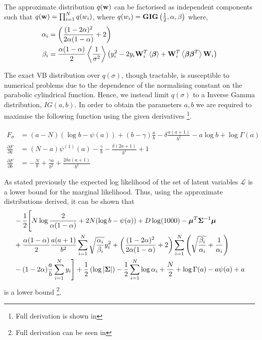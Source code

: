 \documentclass[12pt,epsf]{article}
\begin{document}
The approximate distribution $q(\mathbf{w})$ can be factorised as independent components such that $q(\mathbf{w})=\prod_{i=1}^{N}q(w_i)$, where
$q(w_i) = \mathbf{GIG}\left(\frac{1}{2},\alpha,\beta\right)$ where,
\begin{align}
\alpha_i & =\left(\frac{(1-2\alpha)^2}{2\alpha(1-\alpha)}+2\right) \\
\beta_i & = \frac{\alpha(1-\alpha)}{2}\left\langle\frac{1}{\sigma^2}\right\rangle\left(y_i^2-2y_i\mathbf{W}_i^T\left\langle\bm{\beta}\right\rangle+\mathbf{W}_i^T\left\langle\bm{\beta}\bm{\beta}^T\right\rangle\mathbf{W}_i\right)
\end{align}

The exact VB distribution over $q(\sigma)$, though tractable, is susceptible to numerical problems due to the dependence of the
normalising constant on the parabolic cylindrical function. Hence, we instead limit $q(\sigma)$ to a Inverse Gamma
distribution, $IG(a,b)$. In order to obtain the parameters $a,b$ we are required to maximise the following function
using the given derivatives \footnote{Full derivation is shown in }.

\begin{align}
F_\sigma&=(a-N)(\log b-\psi(a))+(b-\gamma)\frac{a}{b}-\delta \frac{a(a+1)}{b^2}-a\log b+\log \Gamma(a)\\
\frac{\partial F}{\partial a}&=(N-a)\psi^{(1)}(a)-\frac{\gamma}{b}-\frac{\delta(2a+1)}{b^2}+1\\
\frac{\partial F}{\partial b}&=-\frac{N}{b}+\frac{\gamma a}{b^2}+\frac{2\delta a(a+1)}{b^3}
\end{align}

As stated previously the expected log likelihood of the set of latent variables $\mathcal{L}$ is a lower bound for the
marginal likelihood. Thus, using the approximate distributions derived, it can be shown that
\begin{align}
\nonumber &-\frac{1}{2}\Biggl[N\log\frac{2}{\alpha(1-\alpha)} +2N(\log b -\psi(a))+D\log (1000)-{\boldsymbol{\mu}}^T{\mathbf{\Sigma}}^{-1}{\boldsymbol{\mu}}\\
\nonumber&+\frac{\alpha(1-\alpha)}{2}\frac{a(a+1)}{b^2}\sum_{i=1}^{N}\sqrt{\frac{\alpha_i}{\beta_i}}y_i^2+\left(\frac{(1-2\alpha)^2}{2\alpha(1-\alpha)}+2\right)\sum_{i=1}^{N}\left(\sqrt{\frac{\beta_i}{\alpha_i}}+\frac{1}{\alpha_i}\right)\\
&-(1-2\alpha)\frac{a}{b}\sum_{i=1}^{N} y_i\Biggr]
+\frac{1}{2}\left(\log|{\mathbf{\Sigma}}|\right)-\frac{1}{2}\sum_{i=1}^{N}\log\alpha_i+\frac{N}{2}+\log \Gamma(a)-a\psi(a)+a
\end{align}
is a lower bound \footnote{Full derivation can be seen in }.
\end{document}

